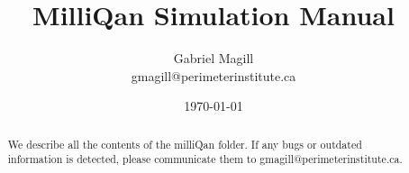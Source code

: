 \documentclass[prd,noshowpacs,nofootinbib,amsmath,amssymb,superscriptaddress]{revtex4}
\begin{document}
\title{MilliQan Simulation Manual}
\author{Gabriel Magill\\ gmagill@perimeterinstitute.ca}
\date{\today}

\newcommand{\be}{\begin{equation}}
\newcommand{\ee}{\end{equation}}
\newcommand{\bea}{\begin{eqnarray}}
\newcommand{\eea}{\end{eqnarray}}
\newcommand{\Gev}{\,\,\mathrm{GeV}}
\newcommand{\SUWeak}{\mathrm{SU}(2)_{\rm W}}
\newcommand{\Lag}{\mathcal{L}}
\newcommand{\Lagtree}{\mathcal{L}_{\rm tree}}
\newcommand{\benum}{\begin{enumerate}}
\newcommand{\eenum}{\end{enumerate}}
\newcommand{\bi}{\begin{itemize}}
\newcommand{\ei}{\end{itemize}}
\newcommand{\Mp}{M_{\rm Pl}}

\begin{abstract}
We describe all the contents of the milliQan folder. If any bugs or outdated information is detected, please communicate them to gmagill@perimeterinstitute.ca.
\end{abstract}

\maketitle
\end{document}
